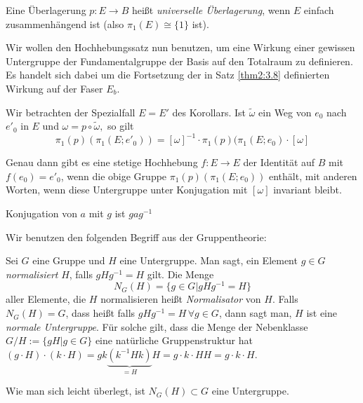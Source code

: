 \documentclass[a4paper,10pt]{scrartcl}
\begin{document}
\begin{df}
 Eine Überlagerung $p:E\to B$ heißt \emph{universelle Überlagerung}, wenn $E$ einfach zusammenhängend ist (also $\pi_1(E)\cong \{1\}$ ist).
\end{df}
Wir wollen den Hochhebungssatz nun benutzen, um eine Wirkung einer gewissen Untergruppe der Fundamentalgruppe der Basis auf den Totalraum zu definieren. Es handelt sich dabei um die Fortsetzung der in Satz \ref{thm2:3.8} definierten Wirkung auf der Faser $E_b$.

Wir betrachten der Spezialfall $E=E'$ des Korollars. Ist $\tilde \omega$ ein Weg von  $e_0$ nach $e'_0$ in $E$ und $\omega=p\circ \tilde \omega,$ so gilt
\[
 \pi_1(p)(\pi_1(E;e'_0))=[\omega]^{-1}\cdot \pi_1(p)(\pi_1(E;e_0)\cdot [\omega]
\]
\begin{figure}[H]
\centering
 \fixme[fig91]
\caption{}
\end{figure}
Genau dann gibt es eine stetige Hochhebung $f:E\to E$ der Identität auf $B$ mit $f(e_0)=e'_0$, wenn die obige Gruppe $\pi_1(p)(\pi_1(E;e_0))$ enthält, mit anderen Worten, wenn diese Untergruppe unter Konjugation mit $[\omega]$ invariant bleibt.

\begin{note*}
Konjugation von $a$ mit $g$ ist $gag^{-1}$
\end{note*}

Wir benutzen den folgenden Begriff aus der Gruppentheorie:

Sei $G$ eine Gruppe und $H$ eine Untergruppe. Man sagt, ein Element $g\in G$ \emph{normalisiert} $H$, falls $gHg^{-1}=H$ gilt. Die Menge 
\[
 N_G(H)=\{g\in G| gHg^{-1}=H\}
\]
aller Elemente, die $H$ normalisieren heißt \emph{Normalisator} von $H$. Falls $N_G(H)=G$, dass heißt falls $gHg^{-1}=H \, \forall g\in G$, dann sagt man, $H$ ist eine \emph{normale Untergruppe}. Für solche gilt, dass die Menge der Nebenklasse $G/H:=\{gH|g\in G\}$ eine natürliche Gruppenstruktur hat $(g\cdot H)\cdot (k\cdot H)=g k \underbrace{(k^{-1}Hk)}_{=H}H=g\cdot k \cdot HH=g\cdot k \cdot H$.

Wie man sich leicht überlegt, ist $N_G(H)\subset G$ eine Untergruppe.  
\end{document}
